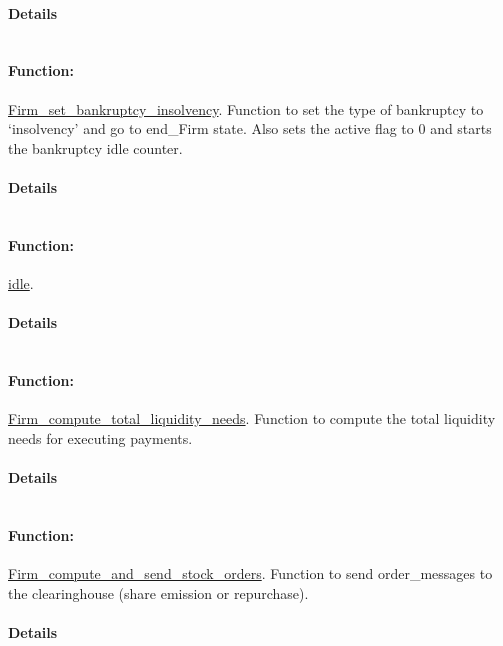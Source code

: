 \documentclass[a4paper,11pt]{article}
\begin{document}
\paragraph{Details}
\begin{verbatim}
\end{verbatim}
\paragraph{Function:}\url{Firm_set_bankruptcy_insolvency}.
Function to set the type of bankruptcy to `insolvency' and go to end\_Firm state. 
Also sets the active flag to 0 and starts the bankruptcy idle counter. 

\paragraph{Details}
\begin{verbatim}
\end{verbatim}
\paragraph{Function:}\url{idle}.

\paragraph{Details}
\begin{verbatim}
\end{verbatim}
\paragraph{Function:}\url{Firm_compute_total_liquidity_needs}.
Function to compute the total liquidity needs for executing payments.
\paragraph{Details}
\begin{verbatim}
\end{verbatim}
\paragraph{Function:}\url{Firm_compute_and_send_stock_orders}.
Function to send order\_messages to the clearinghouse (share emission or repurchase).
\paragraph{Details}
\begin{verbatim}
\end{verbatim}
\end{document}
